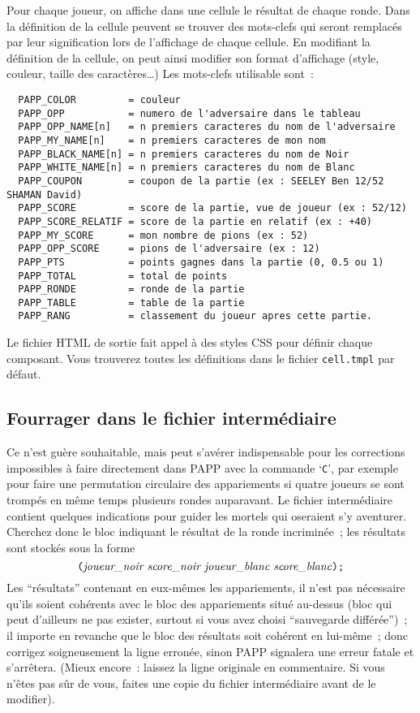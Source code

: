 \documentclass[10pt]{article}
\begin{document}
Pour chaque joueur, on affiche dans une cellule le résultat
de chaque ronde. Dans la définition de la cellule peuvent se trouver
des mots-clefs qui seront remplacés
par leur signification lors de l'affichage de chaque cellule.
En modifiant la définition de la cellule, on peut ainsi  modifier son format d'affichage
(style, couleur, taille des caractères\ldots)
Les mots-clefs utilisable sont~:
\begin{verbatim}
  PAPP_COLOR         = couleur
  PAPP_OPP           = numero de l'adversaire dans le tableau 
  PAPP_OPP_NAME[n]   = n premiers caracteres du nom de l'adversaire
  PAPP_MY_NAME[n]    = n premiers caracteres de mon nom
  PAPP_BLACK_NAME[n] = n premiers caracteres du nom de Noir
  PAPP_WHITE_NAME[n] = n premiers caracteres du nom de Blanc
  PAPP_COUPON        = coupon de la partie (ex : SEELEY Ben 12/52 SHAMAN David)
  PAPP_SCORE         = score de la partie, vue de joueur (ex : 52/12)
  PAPP_SCORE_RELATIF = score de la partie en relatif (ex : +40)
  PAPP_MY_SCORE      = mon nombre de pions (ex : 52)
  PAPP_OPP_SCORE     = pions de l'adversaire (ex : 12)
  PAPP_PTS           = points gagnes dans la partie (0, 0.5 ou 1) 
  PAPP_TOTAL         = total de points
  PAPP_RONDE         = ronde de la partie
  PAPP_TABLE         = table de la partie
  PAPP_RANG          = classement du joueur apres cette partie.
\end{verbatim}

Le fichier HTML de sortie fait appel à des styles CSS pour définir chaque composant.
Vous trouverez toutes les définitions dans le fichier \verb|cell.tmpl| par défaut.

\subsection{Fourrager dans le fichier intermédiaire}

Ce n'est guère souhaitable, mais peut s'avérer indispensable pour 
les corrections impossibles à faire directement dans PAPP avec la 
commande `\verb|C|', par exemple pour faire une permutation circulaire 
des appariements si quatre joueurs se sont trompés en même temps 
plusieurs rondes auparavant.  Le fichier intermédiaire contient 
quelques indications pour guider les mortels qui oseraient s'y 
aventurer.  Cherchez donc le bloc indiquant le résultat de la ronde 
incriminée~; les résultats sont stockés sous la forme 
$$\hbox{\verb|(|{\it joueur\_noir score\_noir joueur\_blanc 
score\_blanc\/}\verb|);|}
 $$
Les ``résultats'' contenant en eux-mêmes les appariements, il 
n'est pas nécessaire qu'ils soient cohérents avec le bloc des 
appariements situé au-dessus (bloc qui peut d'ailleurs ne pas 
exister, surtout si vous avez choisi ``sauvegarde différée'')~; il 
importe en revanche que le bloc des résultats soit cohérent en 
lui-même~; donc corrigez soigneusement la ligne erronée, sinon PAPP 
signalera une erreur fatale et s'arrêtera.  (Mieux encore~: laissez 
la ligne originale en commentaire.  Si vous n'êtes pas s\^ur de 
vous, faites une copie du fichier intermédiaire avant de le 
modifier).
\end{document}
